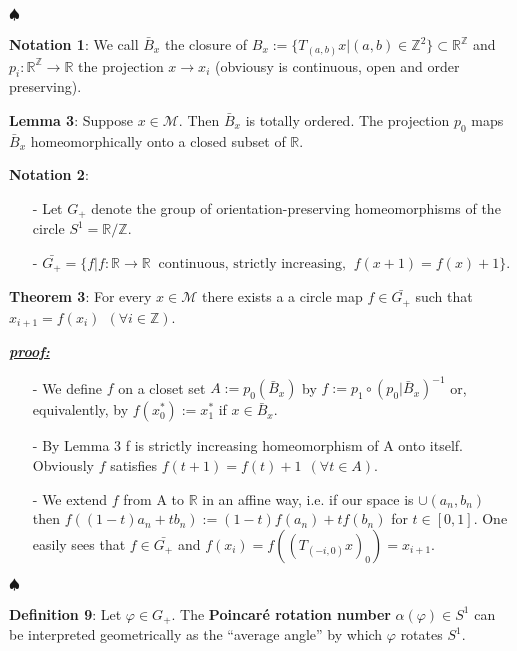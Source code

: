 \documentclass{article}
\begin{document}
	\noindent $\spadesuit$
\color{black}

\noindent \textbf{Notation 1}: We call $\bar{B}_{x}$ the closure of $B_{x} := \{ T_{(a, b)} x | (a, b) \in \mathbb{Z}^{2}  \} \subset \mathbb{R}^{\mathbb{Z}}$ and $p_i: \mathbb{R}^{\mathbb{Z}} \rightarrow \mathbb{R}$ the projection $x \rightarrow x_i$ (obviousy is continuous, open and order preserving).  

\noindent \textbf{Lemma 3}: Suppose $x \in \mathcal{M}$. Then $\bar{B}_{x}$ is totally ordered. The projection $p_0$ maps $\bar{B}_{x}$  homeomorphically onto a closed subset of $\mathbb{R}$.

\noindent \textbf{Notation 2}:
\begin{itemize}
	\item[-]  Let $G_{+}$ denote the group of orientation-preserving homeomorphisms of the circle $S^{1} = \mathbb{R} / \mathbb{Z}$.
	\item[-] $\bar{G_{+}} = \{ f | f : \mathbb{R} \rightarrow \mathbb{R} \ \text{  continuous, strictly increasing, } \ f(x+ 1) = f(x) + 1 \}$.
\end{itemize}

\noindent \textbf{Theorem 3}: For every $x \in \mathcal{M}$ there exists a a circle map $f \in \bar{G_{+}}$ such that $x_{i + 1} = f (x_i) \ \ (\forall i \in \mathbb{Z})$.


\color{blue}
	\noindent \underline{\textbf{\textit{proof:}}} 		
		\begin{itemize}
			\item[-] We define $f$ on a closet set $A:= p_{0} ( \bar{B}_{x})$ by $f:= p_{1} \circ (p_{0} | \bar{B}_{x} )^{-1}$ or, equivalently, by $f(x_{0}^{*}) := x_{1}^{*}$ if $x \in \bar{B}_{x}$.
			\item[-] By Lemma 3 f is strictly increasing homeomorphism of A onto itself. Obviously $f$ satisfies $f(t + 1) = f(t) + 1 \ \ (\forall t \in A)$.
			\item[-] We extend $f$ from A to $\mathbb{R}$ in an affine way, i.e. if our space is $\cup (a_n, b_n)$ then $f ( (1 -t)a_n + t b_n) := (1 - t)f(a_n) + t f(b_n)$ for $t \in [0, 1]$. One easily sees that $f \in \bar{G_{+}}$ and $f(x_i) = f ( (T_{(-i, 0)} x)_{0} ) = x_{i + 1}$.
		\end{itemize}
	
	\noindent $\spadesuit$
\color{black}

\noindent \textbf{Definition 9}: Let $\varphi \in G_{+}$. The \textbf{Poincar\'e rotation number} $\alpha( \varphi) \in S^{1}$ can be interpreted geometrically as the ``average angle'' by which $\varphi$ rotates $S^{1}$.
\end{document}
